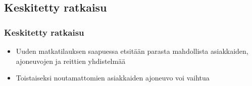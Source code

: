 \documentclass{beamer}
\begin{document}
\subsection{Keskitetty ratkaisu}
\begin{frame}
  \frametitle{Keskitetty ratkaisu}   %
\begin{itemize}
\item
Uuden matkatilauksen saapuessa etsitään parasta mahdollista asiakkaiden, ajoneuvojen ja reittien yhdistelmää
\item
Toistaiseksi noutamattomien asiakkaiden ajoneuvo voi vaihtua
\end{itemize}
  \begin{minipage}{\textwidth}
    \centering
     \\
    \hfill \\

\end{minipage}
\end{frame}
\end{document}
